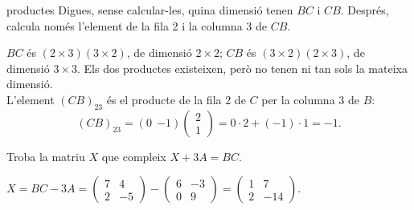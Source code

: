 \begin{apartats}
\begin{tria}{productes}
Digues, sense calcular-les, quina dimensió tenen $BC$ i $CB$. Després, calcula només l'element de la
fila 2 i la columna 3 de $CB$.

\begin{solucio}
$BC$ és $(2\times3)(3\times2)$, de dimensió $2\times2$; $CB$ és $(3\times2)(2\times3)$, de dimensió
$3\times3$. Els dos productes existeixen, però no tenen ni tan sols la mateixa dimensió.\\
L'element $(CB)_{23}$ és el producte de la fila 2 de $C$ per la columna 3 de $B$:
\[
(CB)_{23}=(0\ \ {-1})\begin{pmatrix}2\\1\end{pmatrix}=0\cdot2+(-1)\cdot1=-1.
\]
\end{solucio}
\end{tria}

\begin{nomesllarg}
Troba la matriu $X$ que compleix $X+3A=BC$.

\begin{solucio}
$X=BC-3A=\begin{pmatrix}7&4\\2&-5\end{pmatrix}-\begin{pmatrix}6&-3\\0&9\end{pmatrix}
=\begin{pmatrix}1&7\\2&-14\end{pmatrix}$.
\end{solucio}
\end{nomesllarg}

\end{apartats}
